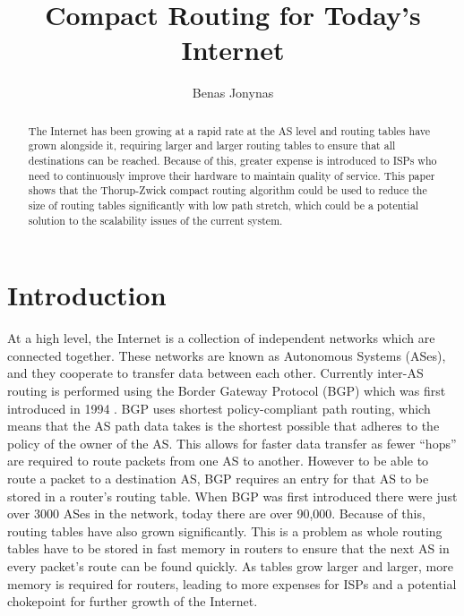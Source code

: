 \documentclass{mpaper}
\begin{document}
\title{Compact Routing for Today's Internet}
\author{Benas Jonynas}

\maketitle

\begin{abstract}
    The Internet has been growing at a rapid rate at the AS level and routing tables have grown alongside it, requiring larger and larger routing tables to ensure that all destinations can be reached. Because of this, greater expense is introduced to ISPs who need to continuously improve their hardware to maintain quality of service. This paper shows that the Thorup-Zwick compact routing algorithm could be used to reduce the size of routing tables significantly with low path stretch, which could be a potential solution to the scalability issues of the current system.
\end{abstract}

\section{Introduction}

At a high level, the Internet is a collection of independent networks which are connected together. These networks are known as Autonomous Systems (ASes), and they cooperate to transfer data between each other. Currently inter-AS routing is performed using the Border Gateway Protocol (BGP) which was first introduced in 1994 \cite{rfc4271}. BGP uses shortest policy-compliant path routing, which means that the AS path data takes is the shortest possible that adheres to the policy of the owner of the AS. This allows for faster data transfer as fewer ``hops'' are required to route packets from one AS to another. However to be able to route a packet to a destination AS, BGP requires an entry for that AS to be stored in a router's routing table. When BGP was first introduced there were just over 3000 \cite{RIRStats} ASes in the network, today there are over 90,000. Because of this, routing tables have also grown significantly. This is a problem as whole routing tables have to be stored in fast memory in routers to ensure that the next AS in every packet's route can be found quickly. As tables grow larger and larger, more memory is required for routers, leading to more expenses for ISPs and a potential chokepoint for further growth of the Internet. 
\end{document}

